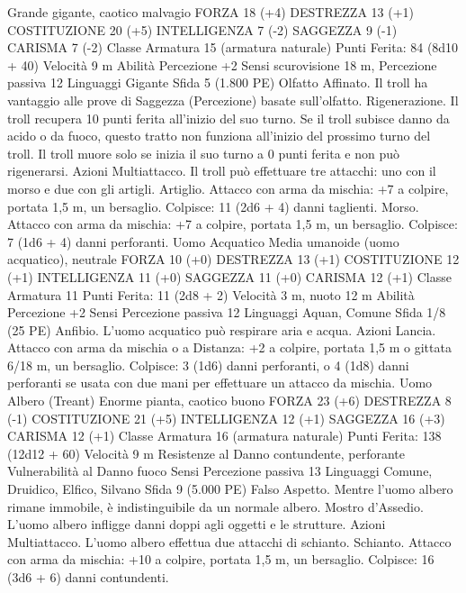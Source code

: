 \begin{multicols}{2}
Grande gigante, caotico malvagio
FORZA 18 (+4)
DESTREZZA 13 (+1)
COSTITUZIONE 20 (+5)
INTELLIGENZA 7 (-2)
SAGGEZZA 9 (-1)
CARISMA 7 (-2)
Classe Armatura 15 (armatura naturale)
\hspace*{0pt}\hfill{Punti Ferita}: 84 (8d10 + 40)
Velocità 9 m
Abilità Percezione +2
Sensi scurovisione 18 m, Percezione passiva 12
Linguaggi Gigante
Sfida 5 (1.800 PE)
Olfatto Affinato. Il troll ha vantaggio alle prove di Saggezza
(Percezione) basate sull’olfatto.
Rigenerazione. Il troll recupera 10 punti ferita all’inizio del suo
turno. Se il troll subisce danno da acido o da fuoco, questo tratto
non funziona all’inizio del prossimo turno del troll. Il troll muore
solo se inizia il suo turno a 0 punti ferita e non può rigenerarsi.
Azioni
Multiattacco. Il troll può effettuare tre attacchi: uno con il morso
e due con gli artigli.
Artiglio. Attacco con arma da mischia: +7 a colpire, portata 1,5
m, un bersaglio.
Colpisce: 11 (2d6 + 4) danni taglienti.
Morso. Attacco con arma da mischia: +7 a colpire, portata 1,5
m, un bersaglio.
Colpisce: 7 (1d6 + 4) danni perforanti.
Uomo Acquatico
Media umanoide (uomo acquatico), neutrale
FORZA 10 (+0)
DESTREZZA 13 (+1)
COSTITUZIONE 12 (+1)
INTELLIGENZA 11 (+0)
SAGGEZZA 11 (+0)
CARISMA 12 (+1)
Classe Armatura 11
\hspace*{0pt}\hfill{Punti Ferita}: 11 (2d8 + 2)
Velocità 3 m, nuoto 12 m
Abilità Percezione +2
Sensi Percezione passiva 12
Linguaggi Aquan, Comune
Sfida 1/8 (25 PE)
Anfibio. L’uomo acquatico può respirare aria e acqua.
Azioni
Lancia. Attacco con arma da mischia o a Distanza: +2 a colpire,
portata 1,5 m o gittata 6/18 m, un bersaglio.
Colpisce: 3 (1d6) danni perforanti, o 4 (1d8) danni perforanti se
usata con due mani per effettuare un attacco da mischia.
Uomo Albero (Treant)
Enorme pianta, caotico buono
FORZA 23 (+6)
DESTREZZA 8 (-1)
COSTITUZIONE 21 (+5)
INTELLIGENZA 12 (+1)
SAGGEZZA 16 (+3)
CARISMA 12 (+1)
Classe Armatura 16 (armatura naturale)
\hspace*{0pt}\hfill{Punti Ferita}: 138 (12d12 + 60)
Velocità 9 m
Resistenze al Danno contundente, perforante
Vulnerabilità al Danno fuoco
Sensi Percezione passiva 13
Linguaggi Comune, Druidico, Elfico, Silvano
Sfida 9 (5.000 PE)
Falso Aspetto. Mentre l’uomo albero rimane immobile, è
indistinguibile da un normale albero.
Mostro d’Assedio. L’uomo albero infligge danni doppi agli
oggetti e le strutture.
Azioni
Multiattacco. L’uomo albero effettua due attacchi di schianto.
Schianto. Attacco con arma da mischia: +10 a colpire, portata
1,5 m, un bersaglio.
Colpisce: 16 (3d6 + 6) danni contundenti.

\end{multicols}
